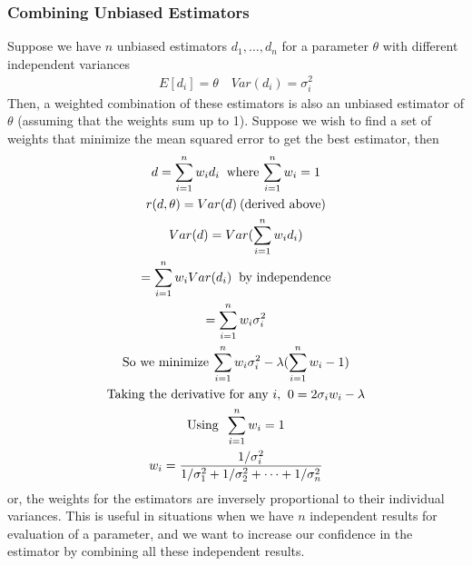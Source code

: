 \documentclass[../probability-notes.tex]{subfiles}
\begin{document}
    \subsubsection{Combining Unbiased Estimators}
    Suppose we have $n$ unbiased estimators $d_{1}, \ldots, d_{n}$ for a parameter $\theta$ with different independent variances
    \begin{align*}
        E[d_{i}] = \theta \quad Var(d_{i}) = \sigma_{i}^{2}
    \end{align*}
    Then, a weighted combination of these estimators is also an unbiased estimator of $\theta$ (assuming that the weights sum up to 1). Suppose we wish to find a set of weights that minimize the mean squared error to get the best estimator, then
    \begin{gather*}
        d = \sum_{i=1}^{n} w_{i} d_{i} \text{\: where $\sum_{i=1}^{n} w_{i} = 1$}\\
        r(d, \theta) = Var(d) \text{\:(derived above)}\\
        Var(d) = Var(\sum_{i=1}^{n} w_{i} d_{i})\\
        = \sum_{i=1}^{n}w_{i} Var(d_{i}) \text{\: by independence}\\
        = \sum_{i=1}^{n}w_{i} \sigma_{i}^{2}\\
        \text{So we minimize\:} \sum_{i=1}^{n}w_{i} \sigma_{i}^{2} - \lambda(\sum_{i=1}^{n} w_{i}-1)\\
        \text{Taking the derivative for any $i$, \:} 0 = 2\sigma_{i} w_{i} - \lambda\\
        \text{Using \:}\sum_{i=1}^{n} w_{i} = 1\\
        w_{i} = \frac{1/\sigma_{i}^{2}}{1/\sigma_{1}^{2} + 1/\sigma_{2}^{2} + \cdots + 1/\sigma_{n}^{2}}
    \end{gather*}
    or, the weights for the estimators are inversely proportional to their individual variances. This is useful in situations when we have $n$ independent results for evaluation of a parameter, and we want to increase our confidence in the estimator by combining all these independent results.\newline


\end{document}
